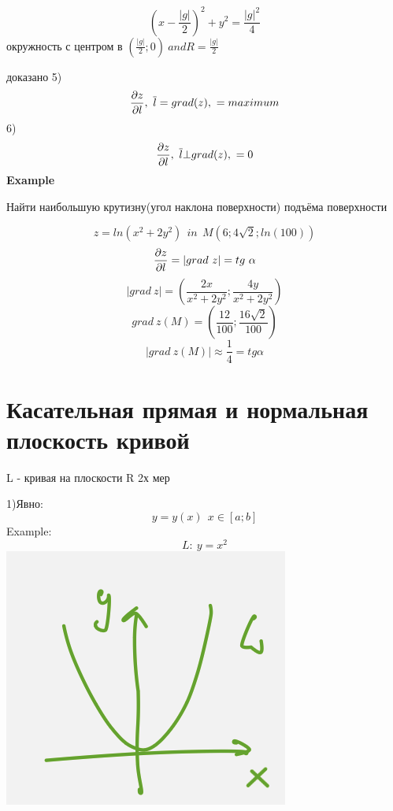 \documentclass{article}
\begin{document}
\begin{equation*}
    \left(x - \frac{|g|}{2}\right)^2+y^2 = \frac{|g|^2}{4}
\end{equation*}
окружность с центром в $(\frac{|g|}{2};0)\ and R = \frac{|g|}{2}$ 

доказано
5) 
\begin{equation*}
    \pdv{z}{l}, \ \overline{l} = grad(z),\ = maximum
\end{equation*}
6)
\begin{equation*}
    \pdv{z}{l}, \ \overline{l} \bot  grad(z),\  = 0
\end{equation*}
\textbf{Example}

Найти наибольшую крутизну(угол наклона поверхности) подъёма поверхности

\begin{equation*}
    z = ln(x^2+2y^2) \ \ in\ \  M(6;4\sqrt{2};ln(100))
\end{equation*}
\begin{equation*}
    \pdv{z}{l} = |grad\ z| = tg\ \alpha
\end{equation*}
\begin{equation*}
    |grad\ z| = (\frac{2x}{x^2+2y^2}; \frac{4y}{x^2+2y^2})
\end{equation*}
\begin{equation*}
    grad\ z(M) = (\frac{12}{100};\frac{16\sqrt{2}}{100})
\end{equation*}
\begin{equation*}
    |grad\ z(M)| \approx  \frac{1}{4} = tg\alpha
\end{equation*}
\section{Касательная прямая и нормальная плоскость кривой}
L - кривая на плоскости R 2х мер


1)Явно:
\begin{equation*}
    y = y(x)\ \ x\in [a;b]
\end{equation*}
Example:
\begin{equation*}
    L:\ y=x^2
\end{equation*}
\includegraphics[width=.3\textwidth]{yavno.png} 
\end{document}
